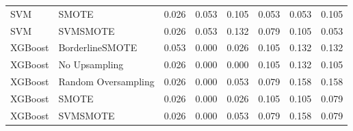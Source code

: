 \begin{tabular}{llllllll}
                         SVM &               SMOTE & 0.026 &                     0.053 &                 0.105 &                  0.053 &                                   0.053 &     0.105 \\
                         SVM &            SVMSMOTE & 0.026 &                     0.053 &                 0.132 &                  0.079 &                                   0.105 &     0.053 \\
                     XGBoost &     BorderlineSMOTE & 0.053 &                     0.000 &                 0.026 &                  0.105 &                                   0.132 &     0.132 \\
                     XGBoost &       No Upsampling & 0.026 &                     0.000 &                 0.000 &                  0.105 &                                   0.132 &     0.105 \\
                     XGBoost & Random Oversampling & 0.026 &                     0.000 &                 0.053 &                  0.079 &                                   0.158 &     0.158 \\
                     XGBoost &               SMOTE & 0.026 &                     0.000 &                 0.026 &                  0.105 &                                   0.105 &     0.079 \\
                     XGBoost &            SVMSMOTE & 0.026 &                     0.000 &                 0.053 &                  0.079 &                                   0.158 &     0.079 \\
\bottomrule
\end{tabular}
